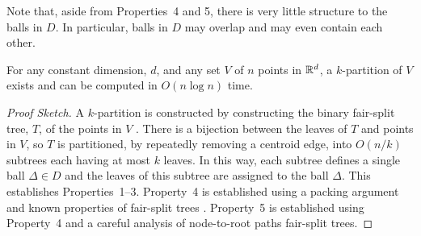 \documentclass{patmorin}
\begin{document}
Note that, aside from Properties~4 and 5, there is very little structure
to the balls in $D$. In particular, balls in $D$ may overlap and may
even contain each other.  

\begin{lem}
  For any constant dimension, $d$, and any set $V$ of $n$ points in
  $\mathbb{R}^d$, a $k$-partition of $V$ exists and can be computed in $O(n\log
  n)$ time.
\end{lem}

\begin{proof}[Proof Sketch]
  A $k$-partition is constructed by constructing the binary fair-split
  tree, $T$, of the points in $V$ \cite{callahan.kosaraju:decomposition}.
  There is a bijection between the leaves of $T$ and points in $V$, so $T$
  is partitioned, by repeatedly removing a centroid edge, into $O(n/k)$
  subtrees each having at most $k$ leaves.  In this way, each subtree
  defines a single ball $\Delta\in D$ and the leaves of this subtree
  are assigned to the ball $\Delta$.  This establishes Properties~1--3.
  Property~4 is established using a packing argument and known properties
  of fair-split trees \cite[Lemma~9.4.3]{narasimhan.smid:geometric}.
  Property~5 is established using Property~4 and a careful analysis of
  node-to-root paths fair-split trees.
%
%

\end{proof}
\end{document}
